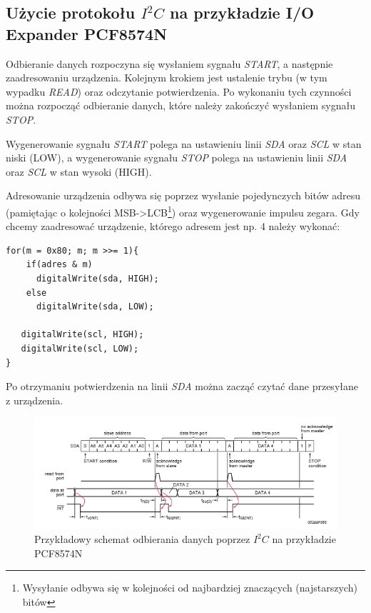\documentclass{xmgr}
\begin{document}
\subsection{Użycie protokołu $I^2C$ na przykładzie I/O Expander PCF8574N}
Odbieranie danych rozpoczyna się wysłaniem sygnału \emph{START}, a następnie zaadresowaniu urządzenia. Kolejnym krokiem jest ustalenie trybu (w tym wypadku \emph{READ}) oraz odczytanie potwierdzenia. Po wykonaniu tych czynności można rozpocząć odbieranie danych, które należy zakończyć wysłaniem sygnału \emph{STOP}.

Wygenerowanie sygnału \emph{START} polega na ustawieniu linii \emph{SDA} oraz \emph{SCL} w stan niski (LOW), a wygenerowanie sygnału \emph{STOP} polega na ustawieniu linii \emph{SDA} oraz \emph{SCL} w stan wysoki (HIGH).

Adresowanie urządzenia odbywa się poprzez wysłanie pojedynczych bitów adresu (pamiętając o kolejności MSB->LCB\footnote{Wysyłanie odbywa się w kolejności od najbardziej znaczących (najstarszych) bitów}) oraz wygenerowanie impulsu zegara. Gdy chcemy zaadresować urządzenie, którego adresem jest np. 4 należy wykonać:
\begin{lstlisting}[label=bot-dirs-alg,caption=Adresowanie urządzenia $I^2C$ na przykładzie PCF8574N]
for(m = 0x80; m; m >>= 1){
    if(adres & m)         
      digitalWrite(sda, HIGH);
    else
      digitalWrite(sda, LOW);
        
   digitalWrite(scl, HIGH);
   digitalWrite(scl, LOW); 
}
\end{lstlisting}
Po otrzymaniu potwierdzenia na linii \emph{SDA} można zacząć czytać dane przesyłane z urządzenia.

\begin{figure}[!h]
    \centering
    \includegraphics[height=0.25\textheight]{images/read_i2c.png}
    \caption{Przykładowy schemat odbierania danych poprzez $I^2C$ na przykładzie PCF8574N\label{$I^2C$}}
\end{figure}
\end{document}
